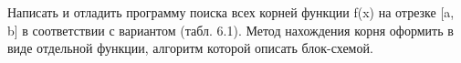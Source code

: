 Написать и отладить программу поиска всех корней функции f(x) на
отрезке [a, b] в соответствии с вариантом (табл. 6.1). Метод нахождения корня
оформить в виде отдельной функции, алгоритм которой описать блок-схемой.